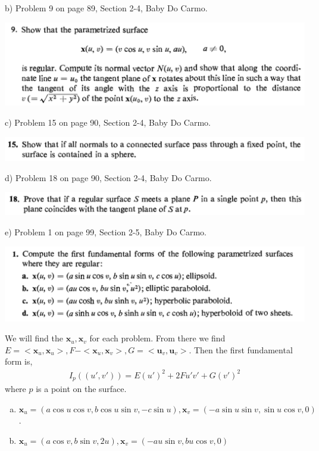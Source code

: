 \documentclass[10pt,letterpaper]{hmcpset}
\begin{document}
\newpage
\begin{problem}
 b) Problem 9 on page 89, Section 2-4, Baby Do Carmo.
 
 \includegraphics[scale=0.7]{Cb.png}
\end{problem}
\newpage
\begin{problem}
c) Problem 15 on page 90, Section 2-4, Baby Do Carmo.

\includegraphics[scale=0.7]{Cc.png}
\end{problem}

\newpage
\begin{problem}
d) Problem 18 on page 90, Section 2-4, Baby Do Carmo.

\includegraphics[scale=0.7]{Cd.png}
\end{problem}

\newpage
\begin{problem}
e) Problem 1 on page 99, Section 2-5, Baby Do Carmo.

\includegraphics[scale=0.7]{Ce.png}
\end{problem}
\begin{solution}
We will find the $\textbf{x}_u, \textbf{x}_v$ for each problem. From there we
find $E=<\textbf{x}_u, \textbf{x}_u>, F - <\textbf{x}_u, \textbf{x}_v>,
G=<\textbf{u}_v, \textbf{u}_v>$. Then the first fundamental form is,
\begin{align*}
  I_p((u', v')) = E (u')^2 + 2Fu'v' + G(v')^2
\end{align*}
where $p$ is a point on the surface. \\
\begin{enumerate}[(a)]
\item $\textbf{x}_u = (a \cos u \cos v, b \cos u \sin v, -c \sin u),
  \textbf{x}_v = (-a \sin u \sin v, \sin u \cos v, 0)$.
\item $\textbf{x}_u = (a \cos v, b \sin v, 2u), \textbf{x}_v = (-au \sin v, bu
  \cos v, 0)$
\end{enumerate}
\end{solution}
\end{document}
